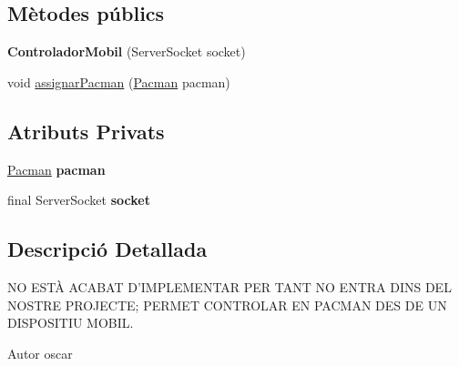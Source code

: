 \subsection*{Mètodes públics}
\begin{DoxyCompactItemize}
\item 
\hypertarget{classlogica_1_1controladors__pacman_1_1_controlador_mobil_ae1e2cc87062728a1c8261c7b3f66483d}{{\bfseries Controlador\+Mobil} (Server\+Socket socket)}\label{classlogica_1_1controladors__pacman_1_1_controlador_mobil_ae1e2cc87062728a1c8261c7b3f66483d}

\item 
void \hyperlink{classlogica_1_1controladors__pacman_1_1_controlador_mobil_a9aabffe23f7920ae8482c7e8906c8d0e}{assignar\+Pacman} (\hyperlink{classlogica_1_1_pacman}{Pacman} pacman)
\end{DoxyCompactItemize}
\subsection*{Atributs Privats}
\begin{DoxyCompactItemize}
\item 
\hypertarget{classlogica_1_1controladors__pacman_1_1_controlador_mobil_af20bf5812477eb1a1a355603b66e1299}{\hyperlink{classlogica_1_1_pacman}{Pacman} {\bfseries pacman}}\label{classlogica_1_1controladors__pacman_1_1_controlador_mobil_af20bf5812477eb1a1a355603b66e1299}

\item 
\hypertarget{classlogica_1_1controladors__pacman_1_1_controlador_mobil_a107d7defcc362303c3c9e7a1f783640e}{final Server\+Socket {\bfseries socket}}\label{classlogica_1_1controladors__pacman_1_1_controlador_mobil_a107d7defcc362303c3c9e7a1f783640e}

\end{DoxyCompactItemize}


\subsection{Descripció Detallada}
N\+O E\+S\+TÀ A\+C\+A\+B\+A\+T D'I\+M\+P\+L\+E\+M\+E\+N\+T\+A\+R P\+E\+R T\+A\+N\+T N\+O E\+N\+T\+R\+A D\+I\+N\+S D\+E\+L N\+O\+S\+T\+R\+E P\+R\+O\+J\+E\+C\+T\+E; P\+E\+R\+M\+E\+T C\+O\+N\+T\+R\+O\+L\+A\+R E\+N P\+A\+C\+M\+A\+N D\+E\+S D\+E U\+N D\+I\+S\+P\+O\+S\+I\+T\+I\+U M\+O\+B\+I\+L. 

\begin{DoxyAuthor}{Autor}
oscar 
\end{DoxyAuthor}


